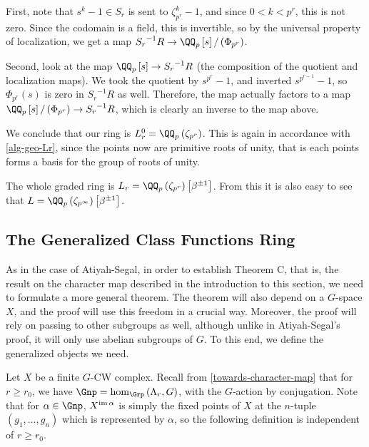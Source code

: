 \begin{example}
	First, note that $s^k-1 \in S_r$ is sent to $\zeta_{p^r}^k - 1$, and since $0 < k < p^r$, this is not zero.
	Since the codomain is a field, this is invertible, so by the universal property of localization, we get a map ${S_r}^{-1} R \to \QQ_p\left[s\right]/\left(\Phi_{p^r}\right)$.
	
	Second, look at the map $\QQ_p\left[s\right] \to {S_r}^{-1} R$ (the composition of the quotient and localization maps).
	We took the quotient by $s^{p^r} - 1$, and inverted $s^{p^{r-1}} - 1$, so $\Phi_{p^r}\left(s\right)$ is zero in ${S_r}^{-1} R$ as well.
	Therefore, the map actually factors to a map $\QQ_p\left[s\right]/\left(\Phi_{p^r}\right) \to {S_r}^{-1} R$, which is clearly an inverse to the map above.
	
	We conclude that our ring is $L_r^0 = \QQ_p\left(\zeta_{p^r}\right)$.
	This is again in accordance with \cref{alg-geo-Lr}, since the points now are primitive roots of unity, that is each points forms a basis for the group of roots of unity.
	
	The whole graded ring is $L_r = \QQ_p\left(\zeta_{p^r}\right)\left[\beta^{\pm 1}\right]$.
	From this it is also easy to see that $L = \QQ_p\left(\zeta_{p^\infty}\right)\left[\beta^{\pm 1}\right]$.
\end{example}



\subsection{The Generalized Class Functions Ring}

As in the case of Atiyah-Segal, in order to establish Theorem C, that is, the result on the character map described in the introduction to this section, we need to formulate a more general theorem.
The theorem will also depend on a $G$-space $X$, and the proof will use this freedom in a crucial way.
Moreover, the proof will rely on passing to other subgroups as well, although unlike in Atiyah-Segal's proof, it will only use abelian subgroups of $G$.
To this end, we define the generalized objects we need.

Let $X$ be a finite $G$-CW complex.
Recall from \cref{towards-character-map} that for $r \geq r_0$, we have $\Gnp = \hom_{\Grp}\left(\Lambda_r, G\right)$, with the $G$-action by conjugation.
Note that for $\alpha \in \Gnp$, $X^{\operatorname{im} \alpha}$ is simply the fixed points of $X$ at the $n$-tuple $\left(g_1, \dotsc, g_n\right)$ which is represented by $\alpha$, so the following definition is independent of $r \geq r_0$.

